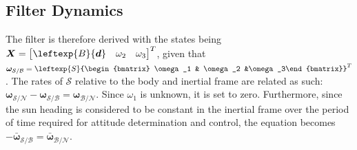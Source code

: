 \documentclass[]{BasiliskReportMemo}
\begin{document}
\subsection{Filter Dynamics} %

The filter is therefore derived with the states being $\bm X =\begin{bmatrix}\leftexp{B}{\bm d} & \omega_2 & \omega_3 \end{bmatrix}^{T}$, given that $\bm \omega_{\mathcal{S}/\mathcal{B}} = \leftexp{S}{\begin{bmatrix} \omega_1 & \omega_2 &\omega_3\end{bmatrix}}^T$. The rates of $\mathcal{S}$ relative to the body and inertial frame are related as such: $\bm \omega_{\mathcal{S}/\mathcal{N}} - \bm \omega_{\mathcal{S}/\mathcal{B}}  = \bm \omega_{\mathcal{B}/\mathcal{N}}$. Since $\omega_1$ is unknown, it is set to zero. Furthermore, since the sun heading is considered to be constant in the inertial frame over the period of time required for attitude determination and control, the equation becomes  $- \bar{\bm \omega}_{\mathcal{S}/\mathcal{B}}  = \bar{\bm \omega}_{\mathcal{B}/\mathcal{N}}$. 
\end{document}
